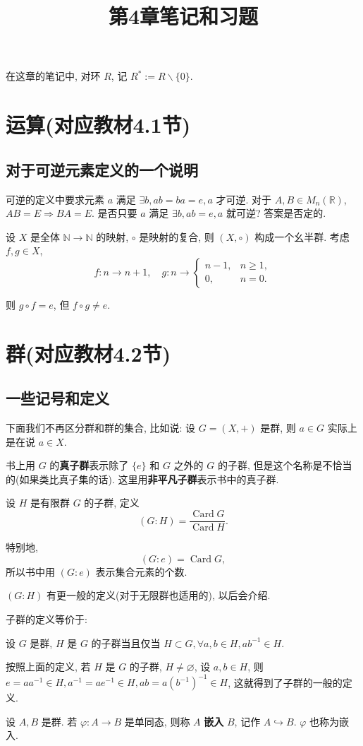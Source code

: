 \documentclass[color=black,device=normal,lang=cn,mode=geye]{elegantnote}
\title{第4章笔记和习题}
\begin{document}
\maketitle
在这章的笔记中, 对环 $R$, 记 $R^*:=R\backslash\{0\}$.
\section{运算(对应教材4.1节)}
\subsection{对于可逆元素定义的一个说明}
可逆的定义中要求元素 $a$ 满足 $\exists b,ab=ba=e,a$ 才可逆. 对于 $A,B\in M_n(\mathbb{R})$, $AB=E\Rightarrow BA=E$. 是否只要 $a$ 满足 $\exists b,ab=e,a$ 就可逆? 答案是否定的.

设 $X$ 是全体 $\mathbb{N}\to\mathbb{N}$ 的映射, $\circ$ 是映射的复合, 则 $(X,\circ)$ 构成一个幺半群. 考虑 $f,g\in X$,
\[f:n\to n+1,\quad g:n\to\begin{cases}
    n-1, & n\geq1, \\
    0, & n=0.
\end{cases}\]

则 $g\circ f=e$, 但 $f\circ g\neq e$.
\section{群(对应教材4.2节)}
\subsection{一些记号和定义}
下面我们不再区分群和群的集合, 比如说: 设 $G=(X,+)$ 是群, 则 $a\in G$ 实际上是在说 $a\in X$.

书上用 $G$ 的\textbf{真子群}表示除了 $\{e\}$ 和 $G$ 之外的 $G$ 的子群, 但是这个名称是不恰当的(如果类比真子集的话). 这里用\textbf{非平凡子群}表示书中的真子群.

设 $H$ 是有限群 $G$ 的子群, 定义
\[(G:H)=\dfrac{\operatorname{Card}G}{\operatorname{Card}H}.\]

特别地,
\[(G:e)=\operatorname{Card}G,\]
所以书中用 $(G:e)$ 表示集合元素的个数.

$(G:H)$ 有更一般的定义(对于无限群也适用的), 以后会介绍.

子群的定义等价于:
\begin{definition}\label{d2.1}
    设 $G$ 是群, $H$ 是 $G$ 的子群当且仅当 $H\subset G,\forall a,b\in H,ab^{-1}\in H$.
\end{definition}

按照上面的定义, 若 $H$ 是 $G$ 的子群, $H\neq\varnothing$, 设 $a,b\in H$, 则 $e=aa^{-1}\in H,a^{-1}=ae^{-1}\in H,ab=a(b^{-1})^{-1}\in H$, 这就得到了子群的一般的定义.
\begin{definition}
    设 $A,B$ 是群. 若 $\varphi:A\to B$ 是单同态, 则称 $A$ \textbf{嵌入} $B$, 记作 $A\hookrightarrow B$. $\varphi$ 也称为嵌入.
\end{definition}
\end{document}
